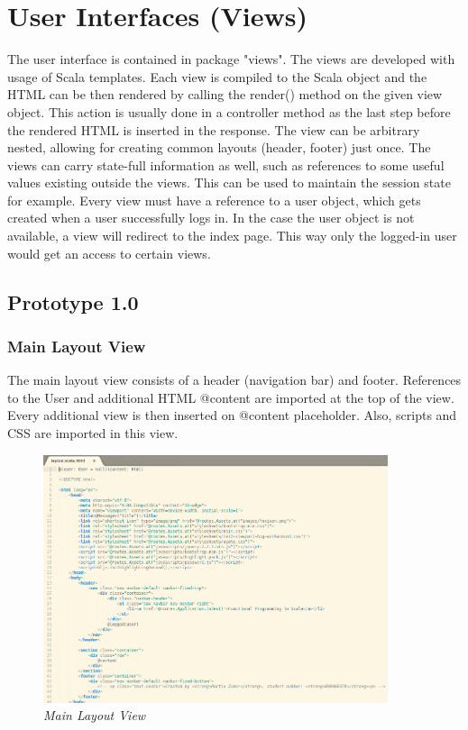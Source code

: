 \documentclass[12pt,twoside,a4paper]{report}
\begin{document}
\section{User Interfaces (Views)}\label{4.3}

The user interface is contained in package "views". The views are developed with usage of Scala templates. Each view is compiled to the Scala object and the HTML can be then rendered by calling the render() method on the given view object. This action is usually done in a controller method as the last step before the rendered HTML is inserted in the response. The view can be arbitrary nested, allowing for creating common layouts (header, footer) just once. The views can carry state-full information as well, such as references to some useful values existing outside the views. This can be used to maintain the session state for example. Every view must have a reference to a user object, which gets created when a user successfully logs in. In the case the user object is not available, a view will redirect to the index page. This way only the logged-in user would get an access to certain views.

\subsection{Prototype 1.0}\label{4.3.1}

\subsubsection{Main Layout View}\label{4.3.1.1}
The main layout view consists of a header (navigation bar) and footer. References to the User and additional HTML @content are imported at the top of the view. Every additional view is then inserted on @content placeholder. Also, scripts and CSS are imported in this view.

\begin{figure}[!ht]
	\centering
		\includegraphics[width=0.9\textwidth, totalheight=8cm]
		{main_layout_view}
	\caption{\textit{Main Layout View}}
	\label{f4.3.1.1}
\end{figure}
\end{document}
